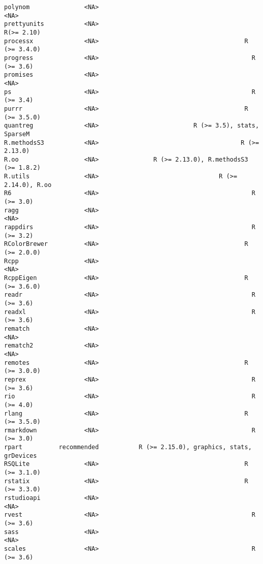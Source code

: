 \documentclass[
  letterpaper,
  DIV=11,
  numbers=noendperiod]{scrreprt}
\begin{document}
\begin{verbatim}
polynom               <NA>                                                <NA>
prettyunits           <NA>                                          R(>= 2.10)
processx              <NA>                                        R (>= 3.4.0)
progress              <NA>                                          R (>= 3.6)
promises              <NA>                                                <NA>
ps                    <NA>                                          R (>= 3.4)
purrr                 <NA>                                        R (>= 3.5.0)
quantreg              <NA>                          R (>= 3.5), stats, SparseM
R.methodsS3           <NA>                                       R (>= 2.13.0)
R.oo                  <NA>               R (>= 2.13.0), R.methodsS3 (>= 1.8.2)
R.utils               <NA>                                 R (>= 2.14.0), R.oo
R6                    <NA>                                          R (>= 3.0)
ragg                  <NA>                                                <NA>
rappdirs              <NA>                                          R (>= 3.2)
RColorBrewer          <NA>                                        R (>= 2.0.0)
Rcpp                  <NA>                                                <NA>
RcppEigen             <NA>                                        R (>= 3.6.0)
readr                 <NA>                                          R (>= 3.6)
readxl                <NA>                                          R (>= 3.6)
rematch               <NA>                                                <NA>
rematch2              <NA>                                                <NA>
remotes               <NA>                                        R (>= 3.0.0)
reprex                <NA>                                          R (>= 3.6)
rio                   <NA>                                          R (>= 4.0)
rlang                 <NA>                                        R (>= 3.5.0)
rmarkdown             <NA>                                          R (>= 3.0)
rpart          recommended           R (>= 2.15.0), graphics, stats, grDevices
RSQLite               <NA>                                        R (>= 3.1.0)
rstatix               <NA>                                        R (>= 3.3.0)
rstudioapi            <NA>                                                <NA>
rvest                 <NA>                                          R (>= 3.6)
sass                  <NA>                                                <NA>
scales                <NA>                                          R (>= 3.6)

\end{verbatim}
\end{document}
